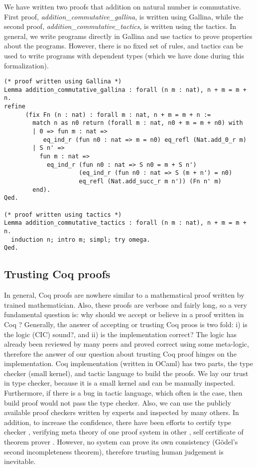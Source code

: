  We have written two proofs that addition on natural number is commutative. 
 First proof, \textit{addition\_commutative\_gallina}, is written using 
 Gallina, while the second proof, \textit{addition\_commutative\_tactics}, is written 
 using the tactics.  In general, we write programs directly in Gallina and use tactics 
 to prove properties about the programs. However, there is no fixed set of rules, and tactics 
 can be used to write programs with dependent types (which we have done during this
 formalization).
 
\begin{verbatim}
(* proof written using Gallina *)
Lemma addition_commutative_gallina : forall (n m : nat), n + m = m + n.
refine
      (fix Fn (n : nat) : forall m : nat, n + m = m + n :=
        match n as n0 return (forall m : nat, n0 + m = m + n0) with
        | 0 => fun m : nat => 
           eq_ind_r (fun n0 : nat => m = n0) eq_refl (Nat.add_0_r m)
        | S n' =>
          fun m : nat =>
            eq_ind_r (fun n0 : nat => S n0 = m + S n')
                     (eq_ind_r (fun n0 : nat => S (m + n') = n0) 
                     eq_refl (Nat.add_succ_r m n')) (Fn n' m)
        end).
Qed.

(* proof written using tactics *)
Lemma addition_commutative_tactics : forall (n m : nat), n + m = m + n.
  induction n; intro m; simpl; try omega.
Qed.
\end{verbatim}



 \subsection{Trusting Coq proofs}
 \label{sec:coqproof}
  In general, Coq proofs are nowhere similar to a mathematical 
  proof written by trained mathematician. Also, these proofs 
  are verbose and fairly long, so a 
  very fundamental question is: why should we 
  accept or believe in a proof written in Coq \citep{pollack1998believe}?  Generally, the answer of 
	accepting or trusting Coq proos is two fold:
  i) is the logic (CIC) sound?, and ii) is the implementation correct?
  The logic has already been reviewed by many peers and proved correct 
  using some meta-logic, therefore the answer of our question about trusting Coq proof 
  hinges on the implementation. 
  Coq implementation (written in OCaml)  has two parts, the type checker (small kernel), 
  and tactic language to build the proofs.
  We lay our trust in type checker, because it is a small kernel and can be 
  manually inspected. Furthermore, if there
  is a bug in tactic language, which often is the case, then build proof would 
  not pass the type checker.  Also, we can use the publicly available proof 
  checkers written by experts and inspected by many others. In addition, to increase the 
  confidence, there have been 
  efforts to certify type checker \citep{Appel2003}
  \citep{barras1996coq}, verifying meta theory of one proof system 
  in other \citep{10.1007/978-3-319-08970-6_3}, self certificate of 
  theorem prover \citep{10.1007/11814771_17}. However, no system can 
  prove its own consistency (G{\"o}del's second incompleteness theorem), therefore
  trusting human judgement is inevitable.
  
